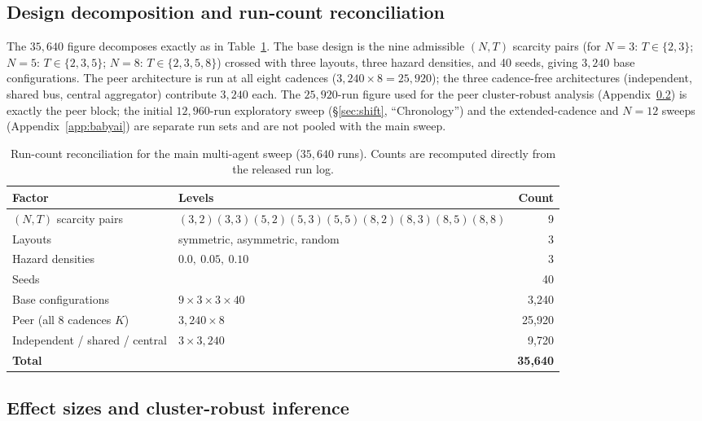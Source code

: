 \documentclass{article}
\begin{document}
\subsection{Design decomposition and run-count reconciliation}
\label{app:design}

The $35{,}640$ figure decomposes exactly as in Table~\ref{tab:design}. The base design is the nine admissible $(N,T)$ scarcity pairs (for $N{=}3$: $T{\in}\{2,3\}$; $N{=}5$: $T{\in}\{2,3,5\}$; $N{=}8$: $T{\in}\{2,3,5,8\}$) crossed with three layouts, three hazard densities, and 40 seeds, giving $3{,}240$ base configurations. The peer architecture is run at all eight cadences ($3{,}240\times 8 = 25{,}920$); the three cadence-free architectures (independent, shared bus, central aggregator) contribute $3{,}240$ each. The $25{,}920$-run figure used for the peer cluster-robust analysis (Appendix~\ref{app:effect-sizes}) is exactly the peer block; the initial $12{,}960$-run exploratory sweep (\S\ref{sec:shift}, ``Chronology'') and the extended-cadence and $N{=}12$ sweeps (Appendix~\ref{app:babyai}) are separate run sets and are not pooled with the main sweep.

\begin{table}[h]
\caption{Run-count reconciliation for the main multi-agent sweep ($35{,}640$ runs). Counts are recomputed directly from the released run log.}
\label{tab:design}
\centering
\small
\begin{tabular}{l l r}
\toprule
Factor & Levels & Count \\
\midrule
$(N,T)$ scarcity pairs & $(3,2)(3,3)(5,2)(5,3)(5,5)(8,2)(8,3)(8,5)(8,8)$ & 9 \\
Layouts & symmetric, asymmetric, random & 3 \\
Hazard densities & $0.0,\ 0.05,\ 0.10$ & 3 \\
Seeds & & 40 \\
\midrule
Base configurations & $9\times3\times3\times40$ & 3{,}240 \\
Peer (all 8 cadences $K$) & $3{,}240\times8$ & 25{,}920 \\
Independent / shared / central & $3\times3{,}240$ & 9{,}720 \\
\midrule
\textbf{Total} & & \textbf{35{,}640} \\
\bottomrule
\end{tabular}
\end{table}

\subsection{Effect sizes and cluster-robust inference}
\label{app:effect-sizes}
\end{document}
